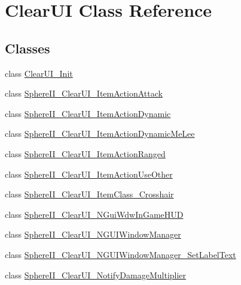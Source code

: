 \hypertarget{class_clear_u_i}{}\section{Clear\+UI Class Reference}
\label{class_clear_u_i}
\subsection*{Classes}
\begin{DoxyCompactItemize}
\item 
class \mbox{\hyperlink{class_clear_u_i_1_1_clear_u_i___init}{Clear\+U\+I\+\_\+\+Init}}
\item 
class \mbox{\hyperlink{class_clear_u_i_1_1_sphere_i_i___clear_u_i___item_action_attack}{Sphere\+I\+I\+\_\+\+Clear\+U\+I\+\_\+\+Item\+Action\+Attack}}
\item 
class \mbox{\hyperlink{class_clear_u_i_1_1_sphere_i_i___clear_u_i___item_action_dynamic}{Sphere\+I\+I\+\_\+\+Clear\+U\+I\+\_\+\+Item\+Action\+Dynamic}}
\item 
class \mbox{\hyperlink{class_clear_u_i_1_1_sphere_i_i___clear_u_i___item_action_dynamic_me_lee}{Sphere\+I\+I\+\_\+\+Clear\+U\+I\+\_\+\+Item\+Action\+Dynamic\+Me\+Lee}}
\item 
class \mbox{\hyperlink{class_clear_u_i_1_1_sphere_i_i___clear_u_i___item_action_ranged}{Sphere\+I\+I\+\_\+\+Clear\+U\+I\+\_\+\+Item\+Action\+Ranged}}
\item 
class \mbox{\hyperlink{class_clear_u_i_1_1_sphere_i_i___clear_u_i___item_action_use_other}{Sphere\+I\+I\+\_\+\+Clear\+U\+I\+\_\+\+Item\+Action\+Use\+Other}}
\item 
class \mbox{\hyperlink{class_clear_u_i_1_1_sphere_i_i___clear_u_i___item_class___crosshair}{Sphere\+I\+I\+\_\+\+Clear\+U\+I\+\_\+\+Item\+Class\+\_\+\+Crosshair}}
\item 
class \mbox{\hyperlink{class_clear_u_i_1_1_sphere_i_i___clear_u_i___n_gui_wdw_in_game_h_u_d}{Sphere\+I\+I\+\_\+\+Clear\+U\+I\+\_\+\+N\+Gui\+Wdw\+In\+Game\+H\+UD}}
\item 
class \mbox{\hyperlink{class_clear_u_i_1_1_sphere_i_i___clear_u_i___n_g_u_i_window_manager}{Sphere\+I\+I\+\_\+\+Clear\+U\+I\+\_\+\+N\+G\+U\+I\+Window\+Manager}}
\item 
class \mbox{\hyperlink{class_clear_u_i_1_1_sphere_i_i___clear_u_i___n_g_u_i_window_manager___set_label_text}{Sphere\+I\+I\+\_\+\+Clear\+U\+I\+\_\+\+N\+G\+U\+I\+Window\+Manager\+\_\+\+Set\+Label\+Text}}
\item 
class \mbox{\hyperlink{class_clear_u_i_1_1_sphere_i_i___clear_u_i___notify_damage_multiplier}{Sphere\+I\+I\+\_\+\+Clear\+U\+I\+\_\+\+Notify\+Damage\+Multiplier}}

\end{DoxyCompactItemize}

